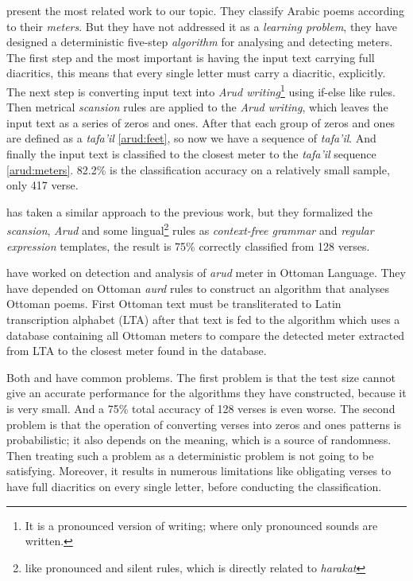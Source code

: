 \documentclass[12pt]{report}
\begin{document}
\citet{Abuata} present the most related work to our topic. They classify
Arabic poems according to their \textit{meters}.  But they have not addressed it
as a \textit{learning problem}, they have designed a deterministic
five-step \textit{algorithm} for analysing  and detecting meters. The first step
and the most important is having the input text carrying full diacritics, this 
means that every single letter must carry a diacritic, explicitly. The next step
is converting input text into \textit{Arud writing}\footnote{It is a pronounced
version of writing; where only pronounced sounds are written.} using if-else like
rules. Then metrical \textit{scansion} rules are applied to the \textit{Arud writing},
which leaves the input text as a series of zeros and ones. After that each group of zeros and
ones are defined as a \textit{tafa'il} \ref{arud:feet}, so now we have a sequence
of \textit{tafa'il}. And finally  the input text is classified to the closest
meter to the \textit{tafa'il} sequence \ref{arud:meters}.
82.2\% is the classification accuracy on a relatively small sample, only 417 verse.

\citet{Alnagdawi2013} has taken a similar approach to the previous work,
but they formalized the \textit{scansion}, \textit{Arud} and some
lingual\footnote{like pronounced and silent rules, which is directly related to
\textit{harakat}} rules as
\textit{context-free grammar} and \textit{regular expression} templates, the
result is 75\% correctly classified from 128 verses.

\citet{Kurt2012} have worked on detection and analysis of \textit{arud} meter in
Ottoman Language. They have depended on Ottoman \textit{aurd} rules to
construct an algorithm that analyses Ottoman poems. First Ottoman text
must be transliterated to Latin transcription alphabet (LTA) after that text is
fed to the algorithm which uses a database containing all Ottoman meters to
compare the detected meter extracted from LTA to the closest meter found in the
database.

Both \citet{Abuata} and \citet{Alnagdawi2013} have common problems.  The first
problem is that the test size cannot give an accurate performance for the algorithms
they have constructed, because it is very small. And a 75\% total accuracy of 128
verses is even worse.
The second problem is that the operation of converting verses into zeros and ones
patterns is probabilistic; it also depends on the meaning, which is a source of
randomness.  Then treating such a problem as a deterministic problem is
not going to be satisfying. Moreover, it results in numerous limitations
like obligating verses to have full diacritics on every single letter, before
conducting the classification.
\end{document}
